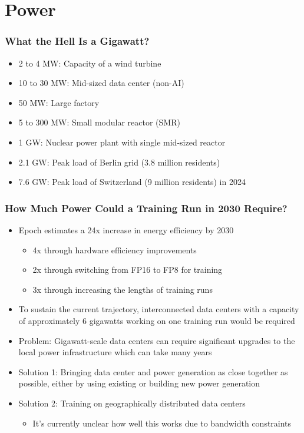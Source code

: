 \documentclass[aspectratio=169]{beamer}
\begin{document}
    \section{Power}
    \begin{frame}
        \frametitle{What the Hell Is a Gigawatt?}
        \begin{itemize}
            \item 2 to 4 MW: Capacity of a wind turbine
            \item 10 to 30 MW: Mid-sized data center (non-AI)
            \item 50 MW: Large factory
            \item 5 to 300 MW: Small modular reactor (SMR)
            \item 1 GW: Nuclear power plant with single mid-sized reactor
            \item 2.1 GW: Peak load of Berlin grid (3.8 million residents)~\parencite{stromnetz_berlin_faktenblatt_2024}
            \item 7.6 GW: Peak load of Switzerland (9 million residents) in 2024~\parencite{swissgrid_netzlast_2025}
        \end{itemize}
    \end{frame}
    \begin{frame}
        \frametitle{How Much Power Could a Training Run in 2030 Require?}
        \begin{itemize}
            \item Epoch estimates a 24x increase in energy efficiency by 2030
            \begin{itemize}
                \item 4x through hardware efficiency improvements
                \item 2x through switching from FP16 to FP8 for training
                \item 3x through increasing the lengths of training runs
            \end{itemize}
            \item To sustain the current trajectory, interconnected data centers with a capacity of approximately \alert{6 gigawatts} working on one training run would be required
            \item Problem: Gigawatt-scale data centers can require significant upgrades to the local power infrastructure which can take many years
            \item Solution 1: Bringing data center and power generation as close together as possible, either by using existing or building new power generation
            \item Solution 2: Training on geographically distributed data centers
            \begin{itemize}
                \item It's currently unclear how well this works due to bandwidth constraints
            \end{itemize}
        \end{itemize}
    \end{frame}
\end{document}

